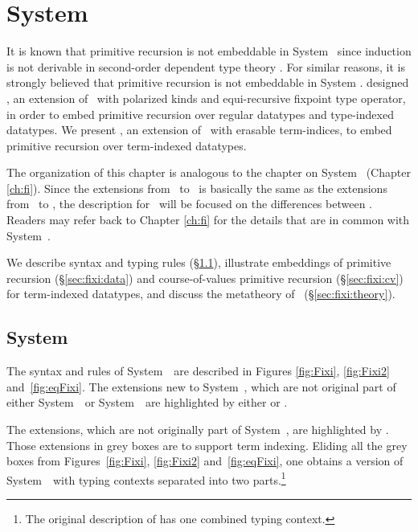 \chapter{System \Fixi}\label{ch:fixi}

It is known that primitive recursion is not embeddable in System \F\ since
induction is not derivable in second-order dependent type theory
\cite{Geuvers01}. For similar reasons, it is strongly believed that
primitive recursion is not embeddable in System \Fw. 
\citet{AbeMat04} designed \Fixw, an extension of \Fw\ with polarized kinds and
equi-recursive fixpoint type operator, in order to embed primitive recursion
over regular datatypes and type-indexed datatypes.
We present \Fixi, an extension of \Fixw\ with erasable term-indices,
to embed primitive recursion over term-indexed datatypes.

The organization of this chapter is analogous to the chapter on System \Fi\
(Chapter \ref{ch:fi}). Since the extensions from \Fixw\ to \Fixi\ is
basically the same as the extensions from \Fw\ to \Fi,
the description for \Fixi\ will be focused on the differences between \Fi.
Readers may refer back to Chapter \ref{ch:fi} for the details that are
in common with System~\Fi.

We describe syntax and typing rules (\S\ref{sec:fixi:def}),
illustrate embeddings of primitive recursion (\S\ref{sec:fixi:data})
and course-of-values primitive recursion (\S\ref{sec:fixi:cv})
for term-indexed datatypes,
and discuss the metatheory of \Fixi\ (\S\ref{sec:fixi:theory}).

\section{System \Fixi} \label{sec:fixi:def}
The syntax and rules of System~\Fi\ are described in
Figures \ref{fig:Fixi}, \ref{fig:Fixi2} and~\ref{fig:eqFixi}.
The extensions new to System~\Fixi, which are not original part of
either System~\Fw\ or System~\Fixw\ are highlighted by either
 or .

The extensions, which are not originally part of System~\Fixw, are highlighted
by \newFi{\text{grey boxes}}. Those extensions in grey boxes are to support
term indexing.  Eliding all the grey boxes from Figures~\ref{fig:Fixi},
\ref{fig:Fixi2} and~\ref{fig:eqFixi},
one obtains a version of System~\Fixw\ with typing contexts separated into
two parts.\footnote{The original description of \Fixw \cite{AbeMat04} has
one combined typing context.}

